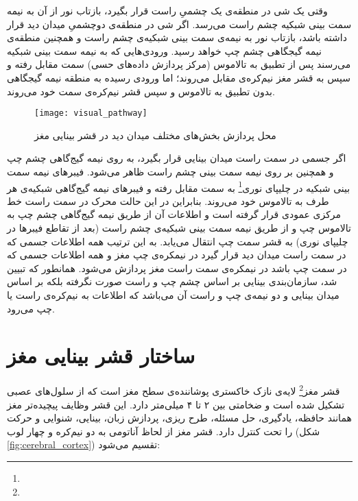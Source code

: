وقتی یک شی در منطقه‌ی یک چشمیِ راست قرار بگیرد، بازتاب نور از آن به نیمه سمت بینی شبکیه چشم راست می‌رسد. اگر شی در منطقه‌ی دوچشمیِ میدان دید قرار داشته باشد، بازتاب نور به نیمه‌ی سمت بینی شبکیه‌ی چشم راست و همچنین منطقه‌ی نیمه گیجگاهی چشم چپ خواهد رسید\cite{kolb20webvision}. ورودی‌هایی که به نیمه سمت بینی شبکیه می‌رسند پس از تطبیق به تالاموس (مرکز پردازش داده‌های حسی) سمت مقابل رفته و سپس به قشر مغز نیم‌کره‌ی مقابل می‌روند؛ اما ورودی رسیده به منطقه نیمه گیجگاهی بدون تطبیق به تالاموس و سپس قشر نیم‌کره‌ی سمت خود می‌روند. 

\begin{figure}
\centering
{\footnotesize
\texttt{[image: visual\_pathway]}
\caption{محل پردازش بخش‌های مختلف میدان دید در قشر بینایی مغز}
\label{fig:visual_pathway}
}
\end{figure}

اگر جسمی در سمت راست میدان بینایی قرار بگیرد، به روی نیمه گیج‌گاهی چشم چپ و همچنین بر روی نیمه سمت بینی چشم راست ظاهر می‌شود. فیبر‌های نیمه سمت بینی شبکیه در چلیپای نوری\footnote{} به سمت مقابل رفته و فیبر‌های نیمه گیج‌گاهی شبکیه‌ی هر طرف به تالاموس خود می‌روند. بنابراین در این حالت محرک در سمت راست خط مرکزی عمودی قرار گرفته است و اطلاعات آن از طریق نیمه گیج‌گاهی چشم چپ به تالاموس چپ و از طریق نیمه سمت بینی شبکیه‌ی چشم راست (بعد از تقاطع فیبر‌ها در چلیپا‌ی نوری) به قشر سمت چپ انتقال می‌یابد. به این ترتیب همه اطلاعات جسمی که در سمت راست میدان دید قرار گیرد در نیمکره‌ی چپ مغز و همه اطلاعات جسمی که در سمت چپ باشد در نیمکره‌ی سمت راست مغز پردازش می‌شود.  همانطور که تبیین شد، سازمان‌بندی بینایی بر اساس چشم چپ و راست صورت نگرفته بلکه بر اساس میدان بینایی و دو نیمه‌ی چپ و راست آن می‌باشد که اطلاعات به نیم‌کره‌ی راست یا چپ می‌رود. 

\section{ساختار قشر بینایی مغز}
قشر مغز\footnote{} لایه‌ی نازک خاکستری پوشاننده‌ی سطح مغز است که از سلول‌های عصبی تشکیل شده است و ضخامتی بین ۲ تا ۴ میلی‌متر دارد. این قشر وظایف پیچیده‌تر مغز همانند حافظه، یادگیری، حل مسئله، طرح ریزی، پردازش زبان، بینایی، شنوایی و حرکت را تحت کنترل دارد. قشر مغز از لحاظ آناتومی به دو نیم‌کره و چهار لوب (شکل \ref{fig:cerebral_cortex}) تقسیم می‌شود:

